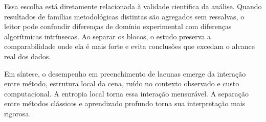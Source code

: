 Essa escolha está diretamente relacionada à validade científica da análise.
Quando resultados de famílias metodológicas distintas são agregados sem ressalvas, o leitor pode confundir diferenças de domínio experimental com diferenças algorítmicas intrínsecas.
Ao separar os blocos, o estudo preserva a comparabilidade onde ela é mais forte e evita conclusões que excedam o alcance real dos dados.

Em síntese, o desempenho em preenchimento de lacunas emerge da interação entre método, estrutura local da cena, ruído no contexto observado e custo computacional.
A entropia local torna essa interação mensurável.
A separação entre métodos clássicos e aprendizado profundo torna sua interpretação mais rigorosa.
